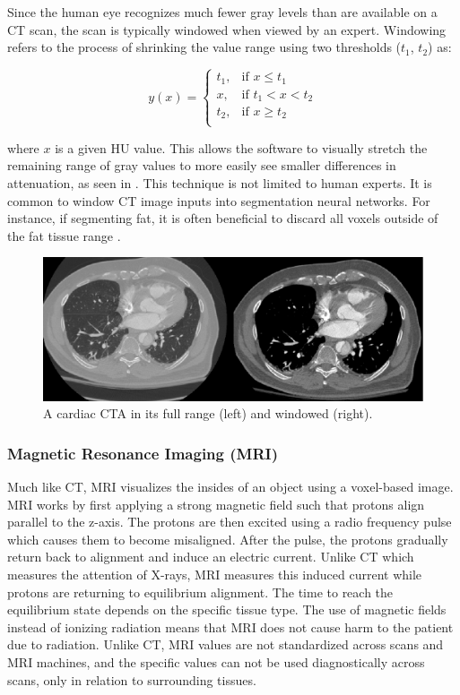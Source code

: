 Since the human eye recognizes much fewer gray levels than are available on a CT scan, the scan is typically windowed when viewed by an expert. Windowing refers to the process of shrinking the value range using two thresholds ($t_1$, $t_2$) as:

\begin{equation}
y(x) = 
    \begin{cases}
        t_1, & \text{if } x \leq t_1\\
        x, & \text{if } t_1 < x < t_2\\
        	t_2, & \text{if } x \geq t_2\\
    \end{cases}
\end{equation}

where $x$ is a given HU value. This allows the software to visually stretch the remaining range of gray values to more easily see smaller differences in attenuation, as seen in . This technique is not limited to human experts. It is common to window CT image inputs into segmentation neural networks. For instance, if segmenting fat, it is often beneficial to discard all voxels outside of the fat tissue range \cite{bencevicRecentProgressEpicardial2022}.

\begin{figure}[h]
 \centering
 \includegraphics[width=\linewidth]{images/windowing-example}
 \caption{A cardiac CTA in its full range (left) and windowed (right). \cite{radlAVTMulticenterAortic2022a}}
 \label{fig:windowing-example}
 \end{figure}

\subsubsection{Magnetic Resonance Imaging (MRI)}

Much like CT, MRI visualizes the insides of an object using a voxel-based image. MRI works by first applying a strong magnetic field such that protons align parallel to the z-axis. The protons are then excited using a radio frequency pulse which causes them to become misaligned. After the pulse, the protons gradually return back to alignment and induce an electric current. Unlike CT which measures the attention of X-rays, MRI measures this induced current while protons are returning to equilibrium alignment. The time to reach the equilibrium state depends on the specific tissue type. The use of magnetic fields instead of ionizing radiation means that MRI does not cause harm to the patient due to radiation. Unlike CT, MRI values are not standardized across scans and MRI machines, and the specific values can not be used diagnostically across scans, only in relation to surrounding tissues.

